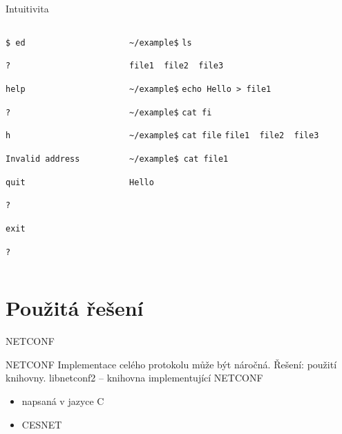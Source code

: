 \documentclass[czech,aspectratio=169]{beamer}
\begin{document}


\begin{frame}[fragile]{Intuitivita}
    \begin{columns}
        \pause{}
        \begin{column}{.47\textwidth}
\verb|$ ed|

\pause{}
\verb||

\verb|?|

\pause{}
\verb|help|

\pause{}
\verb|?|

\pause{}
\verb|h|

\pause{}
\verb|Invalid address|

\pause{}
\verb|quit|

\verb|?|

\pause{}
\verb|exit|

\verb|?|
        \pause{}
        \end{column}
        \begin{column}{.47\textwidth}
\verb|~/example$|\pause{} \verb|ls|

\pause{}
\verb|file1  file2  file3|

\verb|~/example$|\pause{} \verb|echo Hello > file1|

\verb|~/example$|\pause{} \verb|cat fi| \pause{}

\verb|~/example$| \verb|cat file|
\pause{}
\verb|file1  file2  file3|

\verb|~/example$ cat file|\pause{}\verb|1|

\pause{}
\verb|Hello|
        \end{column}
    \end{columns}
\end{frame}

\section{Použitá řešení}
\begin{frame}
\tableofcontents[currentsection]
\end{frame}

\begin{frame}[plain]
\begin{center}
\color{CVUT}
\Large NETCONF
\end{center}
\end{frame}


\begin{frame}{NETCONF}
    Implementace celého protokolu může být náročná. Řešení: použití knihovny.
    \pause{}
    \vfill
    libnetconf2 -- knihovna implementující NETCONF
    \begin{itemize}
        \item napsaná v jazyce C
        \item CESNET
    \end{itemize}
\end{frame}
\end{document}
